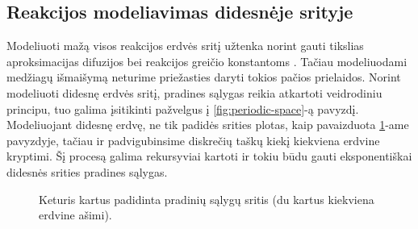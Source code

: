 \newpage

\subsection{Reakcijos modeliavimas didesnėje srityje}

Modeliuoti mažą visos reakcijos erdvės sritį užtenka norint gauti tikslias aproksimacijas difuzijos bei reakcijos greičio konstantoms \cite{mackeviciusCloserLookComputer2012}. Tačiau modeliuodami medžiagų išmaišymą neturime priežasties daryti tokios pačios prielaidos. Norint modeliuoti didesnę erdvės sritį, pradines sąlygas reikia atkartoti veidrodiniu principu, tuo galima įsitikinti pažvelgus į \ref{fig:periodic-space}-ą pavyzdį. Modeliuojant didesnę erdvę, ne tik padidės srities plotas, kaip pavaizduota \ref{large-initial-conditions}-ame pavyzdyje, tačiau ir padvigubinsime diskrečių taškų kiekį kiekviena erdvine kryptimi. Šį procesą galima rekursyviai kartoti ir tokiu būdu gauti eksponentiškai didesnės srities pradines sąlygas.


\begin{figure}[h!]
\centering
{}
\caption{Keturis kartus padidinta pradinių sąlygų sritis (du kartus kiekviena erdvine ašimi). }

\label{large-initial-conditions}
\end{figure}


